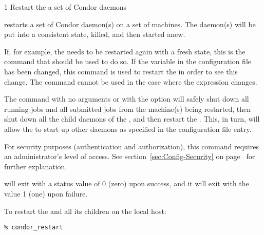 \begin{ManPage}{\label{man-condor-restart}}{1}
{Restart the a set of Condor daemons}
\Synopsis {}
\ToolArgsBase

\ToolDebugOption
\ToolArgsLocate
\ToolArgsAffect

\ToolDebugOption
\ToolWhere
\ToolArgsAffect


\Description 

 restarts a set of Condor daemon(s) on a set
of machines.
The daemon(s) will be put into a consistent state,
killed, and then started anew.

If, for example, the  needs to be restarted again with
a fresh state, this is the command that should be used to do so.
If the  variable in the configuration file has
been changed, this command is used to restart the 
in order to see this change.
The  command cannot be used in the case where the
 expression changes.

The command
 with no arguments or with the 
 option
will safely shut down all running jobs and all submitted
jobs from the machine(s) being restarted, then shut down
all the child daemons of the ,
and then restart the .
This, in turn, will allow the  to start up
other daemons as specified in the  configuration
file entry.

For security purposes (authentication and authorization),
this command requires an administrator's level of access.
See
section~\ref{sec:Config-Security} on page~\pageref{sec:Config-Security}
for further explanation.

\begin{Options}
	\ToolArgsDesc
	\ToolDebugDesc
\end{Options}

\ExitStatus

 will exit with a status value of 0 (zero) upon success,
and it will exit with the value 1 (one) upon failure.

\Examples
To restart the  and all its children
on the local host:
\begin{verbatim}
% condor_restart
\end{verbatim}


\end{ManPage}
